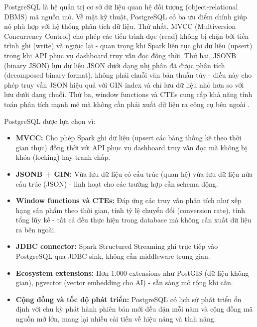 \documentclass[../BTL.tex]{subfiles}
\begin{document}
PostgreSQL là hệ quản trị cơ sở dữ liệu quan hệ đối tượng (object-relational DBMS) mã nguồn mở. Về mặt kỹ thuật, PostgreSQL có ba ưu điểm chính giúp nó phù hợp với hệ thống phân tích dữ liệu. Thứ nhất, MVCC (Multiversion Concurrency Control) cho phép các tiến trình đọc (read) không bị chặn bởi tiến trình ghi (write) và ngược lại - quan trọng khi Spark liên tục ghi dữ liệu (upsert) trong khi API phục vụ dashboard truy vấn đọc đồng thời. Thứ hai, JSONB (binary JSON) lưu dữ liệu JSON dưới dạng nhị phân đã được phân tích (decomposed binary format), không phải chuỗi văn bản thuần túy - điều này cho phép truy vấn JSON hiệu quả với GIN index và chỉ lưu dữ liệu nhỏ hơn so với lưu dưới dạng chuỗi. Thứ ba, window functions và CTEs cung cấp khả năng tính toán phân tích mạnh mẽ mà không cần phải xuất dữ liệu ra công cụ bên ngoài \cite{postgresql_vs_mongodb_modern}.

PostgreSQL được lựa chọn vì:
\begin{itemize}
    \item \textbf{MVCC:} Cho phép Spark ghi dữ liệu (upsert các bảng thống kê theo thời gian thực) đồng thời với API phục vụ dashboard truy vấn đọc mà không bị khóa (locking) hay tranh chấp.
    \item \textbf{JSONB + GIN:} Vừa lưu dữ liệu có cấu trúc (quan hệ) vừa lưu dữ liệu nửa cấu trúc (JSON) - linh hoạt cho các trường hợp cần schema động.
    \item \textbf{Window functions và CTEs:} Đáp ứng các truy vấn phân tích như xếp hạng sản phẩm theo thời gian, tính tỷ lệ chuyển đổi (conversion rate), tính tổng lũy kế - tất cả đều thực hiện trong database mà không cần xuất dữ liệu ra bên ngoài.
    \item \textbf{JDBC connector:} Spark Structured Streaming ghi trực tiếp vào PostgreSQL qua JDBC sink, không cần middleware trung gian.
    \item \textbf{Ecosystem extensions:} Hơn 1.000 extensions như PostGIS (dữ liệu không gian), pgvector (vector embedding cho AI) - sẵn sàng mở rộng khi cần.
    \item \textbf{Cộng đồng và tốc độ phát triển:} PostgreSQL có lịch sử phát triển ổn định với chu kỳ phát hành phiên bản mới đều đặn mỗi năm và cộng đồng mã nguồn mở lớn, mang lại nhiều cải tiến về hiệu năng và tính năng.
\end{itemize}
\end{document}
